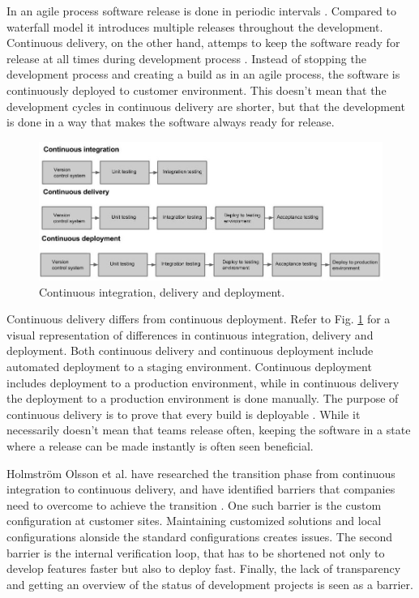 \documentclass[english]{tktltiki2}
\theoremstyle{definition}
\theoremstyle{remark}
\begin{document}
In an agile process software release is done in periodic intervals \cite{cockburn2002agile}. Compared to waterfall model it introduces multiple releases throughout the development. Continuous delivery, on the other hand, attemps to keep the software ready for release at all times during development process \cite{cdbook}. Instead of stopping the development process and creating a build as in an agile process, the software is continuously deployed to customer environment. This doesn't mean that the development cycles in continuous delivery are shorter, but that the development is done in a way that makes the software always ready for release.
\begin{figure}[h]
	\centering
	\includegraphics[width=5.0in]{rtvd.jpg}
	\caption{Continuous integration, delivery and deployment.}
	\label{fig1}
\end{figure}
Continuous delivery differs from continuous deployment. Refer to Fig. \ref{fig1} for a visual representation of differences in continuous integration, delivery and deployment. Both continuous delivery and continuous deployment include automated deployment to a staging environment. Continuous deployment includes deployment to a production environment, while in continuous delivery the deployment to a production environment is done manually. The purpose of continuous delivery is to prove that every build is deployable \cite{cdbook}. While it necessarily doesn't mean that teams release often, keeping the software in a state where a release can be made instantly is often seen beneficial.

Holmström Olsson et al. have researched the transition phase from continuous integration to continuous delivery, and have identified barriers that companies need to overcome to achieve the transition \cite{olsson2012climbing}. One such barrier is the custom configuration at customer sites. Maintaining customized solutions and local configurations alonside the standard configurations creates issues. The second barrier is the internal verification loop, that has to be shortened not only to develop features faster but also to deploy fast. Finally, the lack of transparency and getting an overview of the status of development projects is seen as a barrier.
\end{document}
